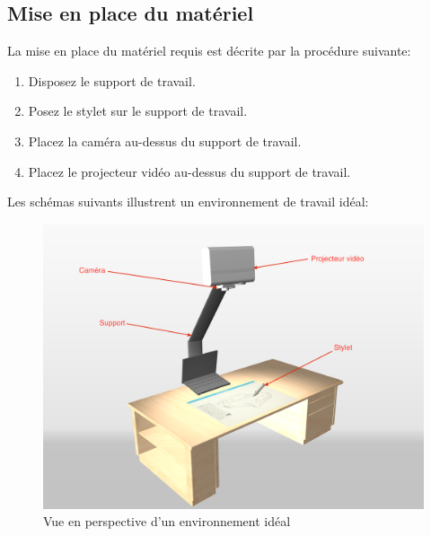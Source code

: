 \documentclass[11pt,a4paper,oldfontcommands]{memoir}
\begin{document}
\subsection{Mise en place du matériel}

La mise en place du matériel requis est décrite par la procédure suivante:

\begin{enumerate}
\item  Disposez le support de travail.
\item  Posez le stylet sur le support de travail.
\item  Placez la caméra au-dessus du support de travail.
\item  Placez le projecteur vidéo au-dessus du support de travail.
\end{enumerate}

Les schémas suivants illustrent un environnement de travail idéal:

\newpage

\begin{figure}[H]
\centering
\includegraphics[angle=90, scale=0.15]{images/drawing-environment.png}
\caption{Vue en perspective d'un environnement idéal}
\end{figure}

\newpage
\end{document}
